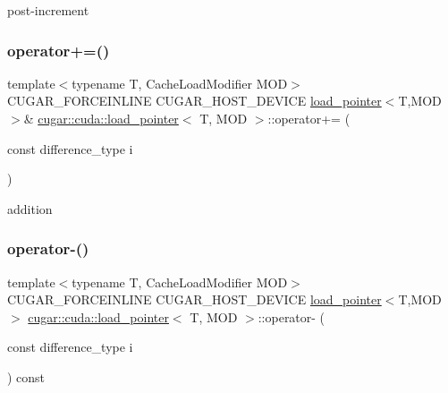 post-\/increment \mbox{\label{structcugar_1_1cuda_1_1load__pointer_ab010c8162c81964d682999df8475274c}} 
\subsubsection{\texorpdfstring{operator+=()}{operator+=()}}
{\footnotesize\ttfamily template$<$typename T, Cache\+Load\+Modifier M\+OD$>$ \\
C\+U\+G\+A\+R\+\_\+\+F\+O\+R\+C\+E\+I\+N\+L\+I\+NE C\+U\+G\+A\+R\+\_\+\+H\+O\+S\+T\+\_\+\+D\+E\+V\+I\+CE \hyperlink{structcugar_1_1cuda_1_1load__pointer}{load\+\_\+pointer}$<$T,M\+OD$>$\& \hyperlink{structcugar_1_1cuda_1_1load__pointer}{cugar\+::cuda\+::load\+\_\+pointer}$<$ T, M\+OD $>$\+::operator+= (\begin{DoxyParamCaption}\item[{const difference\+\_\+type}]{i }\end{DoxyParamCaption})\hspace{0.3cm}{\ttfamily [inline]}}

addition \mbox{\label{structcugar_1_1cuda_1_1load__pointer_ac49a87d9735d0cfa86515294c55ca378}} 
\subsubsection{\texorpdfstring{operator-\/()}{operator-()}\hspace{0.1cm}{\footnotesize\ttfamily [1/2]}}
{\footnotesize\ttfamily template$<$typename T, Cache\+Load\+Modifier M\+OD$>$ \\
C\+U\+G\+A\+R\+\_\+\+F\+O\+R\+C\+E\+I\+N\+L\+I\+NE C\+U\+G\+A\+R\+\_\+\+H\+O\+S\+T\+\_\+\+D\+E\+V\+I\+CE \hyperlink{structcugar_1_1cuda_1_1load__pointer}{load\+\_\+pointer}$<$T,M\+OD$>$ \hyperlink{structcugar_1_1cuda_1_1load__pointer}{cugar\+::cuda\+::load\+\_\+pointer}$<$ T, M\+OD $>$\+::operator-\/ (\begin{DoxyParamCaption}\item[{const difference\+\_\+type}]{i }\end{DoxyParamCaption}) const\hspace{0.3cm}{\ttfamily [inline]}}

